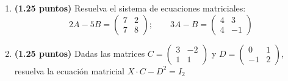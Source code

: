 
\begin{enumerate}[label=\alph*)]
\item \textbf{(1.25 puntos)} Resuelva el sistema de ecuaciones matriciales:
\[
2A-5B=\begin{pmatrix}7&2\\7&8\end{pmatrix};\qquad
3A-B=\begin{pmatrix}4&3\\4&-1\end{pmatrix}
\]
\item \textbf{(1.25 puntos)} Dadas las matrices
$C=\begin{pmatrix}3&-2\\1&1\end{pmatrix}$ y
$D=\begin{pmatrix}0&1\\-1&2\end{pmatrix}$, resuelva la ecuación matricial $X\cdot C-D^2=I_2$
\end{enumerate}
